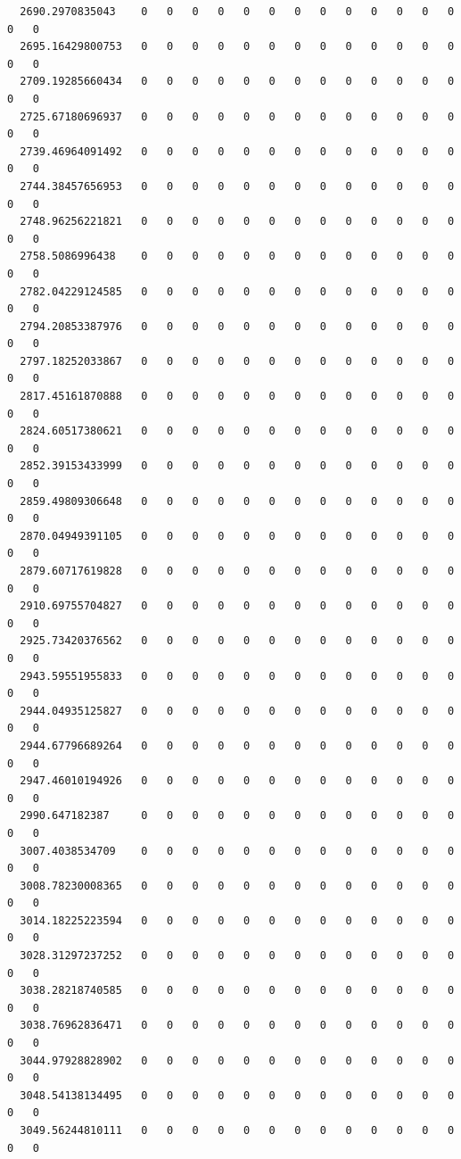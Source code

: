 \documentclass[
  letterpaper,
  DIV=11,
  numbers=noendperiod]{scrartcl}
\begin{document}
\begin{verbatim}
  2690.2970835043    0   0   0   0   0   0   0   0   0   0   0   0   0   0   0
  2695.16429800753   0   0   0   0   0   0   0   0   0   0   0   0   0   0   0
  2709.19285660434   0   0   0   0   0   0   0   0   0   0   0   0   0   0   0
  2725.67180696937   0   0   0   0   0   0   0   0   0   0   0   0   0   0   0
  2739.46964091492   0   0   0   0   0   0   0   0   0   0   0   0   0   0   0
  2744.38457656953   0   0   0   0   0   0   0   0   0   0   0   0   0   0   0
  2748.96256221821   0   0   0   0   0   0   0   0   0   0   0   0   0   0   0
  2758.5086996438    0   0   0   0   0   0   0   0   0   0   0   0   0   0   0
  2782.04229124585   0   0   0   0   0   0   0   0   0   0   0   0   0   0   0
  2794.20853387976   0   0   0   0   0   0   0   0   0   0   0   0   0   0   0
  2797.18252033867   0   0   0   0   0   0   0   0   0   0   0   0   0   0   0
  2817.45161870888   0   0   0   0   0   0   0   0   0   0   0   0   0   0   0
  2824.60517380621   0   0   0   0   0   0   0   0   0   0   0   0   0   0   0
  2852.39153433999   0   0   0   0   0   0   0   0   0   0   0   0   0   0   0
  2859.49809306648   0   0   0   0   0   0   0   0   0   0   0   0   0   0   0
  2870.04949391105   0   0   0   0   0   0   0   0   0   0   0   0   0   0   0
  2879.60717619828   0   0   0   0   0   0   0   0   0   0   0   0   0   0   0
  2910.69755704827   0   0   0   0   0   0   0   0   0   0   0   0   0   0   0
  2925.73420376562   0   0   0   0   0   0   0   0   0   0   0   0   0   0   0
  2943.59551955833   0   0   0   0   0   0   0   0   0   0   0   0   0   0   0
  2944.04935125827   0   0   0   0   0   0   0   0   0   0   0   0   0   0   0
  2944.67796689264   0   0   0   0   0   0   0   0   0   0   0   0   0   0   0
  2947.46010194926   0   0   0   0   0   0   0   0   0   0   0   0   0   0   0
  2990.647182387     0   0   0   0   0   0   0   0   0   0   0   0   0   0   0
  3007.4038534709    0   0   0   0   0   0   0   0   0   0   0   0   0   0   0
  3008.78230008365   0   0   0   0   0   0   0   0   0   0   0   0   0   0   0
  3014.18225223594   0   0   0   0   0   0   0   0   0   0   0   0   0   0   0
  3028.31297237252   0   0   0   0   0   0   0   0   0   0   0   0   0   0   0
  3038.28218740585   0   0   0   0   0   0   0   0   0   0   0   0   0   0   0
  3038.76962836471   0   0   0   0   0   0   0   0   0   0   0   0   0   0   0
  3044.97928828902   0   0   0   0   0   0   0   0   0   0   0   0   0   0   0
  3048.54138134495   0   0   0   0   0   0   0   0   0   0   0   0   0   0   0
  3049.56244810111   0   0   0   0   0   0   0   0   0   0   0   0   0   0   0

\end{verbatim}
\end{document}
